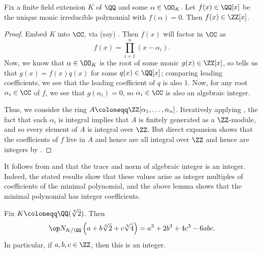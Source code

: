 \documentclass[../notes.tex]{subfiles}
\begin{document}
\begin{lemma} \label{lem:monic-irred-of-alg-int}
	Fix a finite field extension $K$ of $\QQ$ and some $\alpha\in\OO_K$. Let $f(x)\in\QQ[x]$ be the unique monic irreducible polynomial with $f(\alpha)=0$. Then $f(x)\in\ZZ[x]$.
\end{lemma}
\begin{proof}
	Embed $K$ into $\CC$, via (say) . Then $f(x)$ will factor in $\CC$ as
	\[f(x)=\prod_{i=1}^n(x-\alpha_i).\]
	Now, we know that $\alpha\in\OO_K$ is the root of some monic $g(x)\in\ZZ[x]$, so  tells us that $g(x)=f(x)q(x)$ for some $q(x)\in\QQ[x]$; comparing leading coefficients, we see that the leading coefficient of $q$ is also $1$. Now, for any root $\alpha_i\in\CC$ of $f$, we see that $g(\alpha_i)=0$, so $\alpha_i\in\CC$ is also an algebraic integer.

	Thus, we consider the ring $A\coloneqq\ZZ[\alpha_1,\ldots,\alpha_n]$. Iteratively applying , the fact that each $\alpha_i$ is integral implies that $A$ is finitely generated as a $\ZZ$-module, and so every element of $A$ is integral over $\ZZ$. But direct expansion shows that the coefficients of $f$ live in $A$ and hence are all integral over $\ZZ$ and hence are integers by .
\end{proof}
\begin{remark} \label{rem:norm-and-tr-ints}
	It follows from  and  that the trace and norm of algebraic integer is an integer. Indeed, the stated results show that these values arise as integer multiples of coefficients of the minimal polynomial, and the above lemma shows that the minimal polynomial has integer coefficients.
\end{remark}
\begin{example} \label{ex:norm-k-cbrt-2}
	Fix $K\coloneqq\QQ(\sqrt[3]2)$. Then
	\[\op N_{K/\QQ}\left(a+b\sqrt[3]2+c\sqrt[3]4\right)=a^3+2b^3+4c^3-6abc.\]
	In particular, if $a,b,c\in\ZZ$, then this is an integer.
\end{example}
\end{document}

